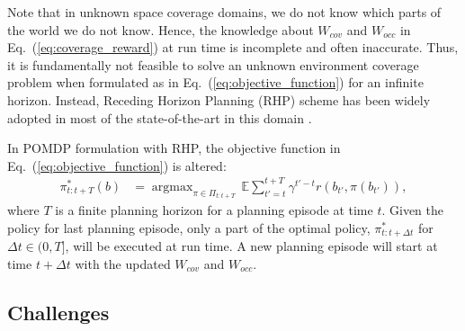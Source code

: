 \documentclass[letterpaper]{article} %
\newcommand{\phdone}[1]{} %
\newcommand{\argmax}{\mathop{\mathrm{argmax}}}
\begin{document}
\phdone{Receding Horizon Planning}
Note that in unknown space coverage domains, we do not know which parts of the world we do not know. Hence, the knowledge about $W_{cov}$ and $W_{occ}$ in Eq.~(\ref{eq:coverage_reward}) at run time is incomplete and often inaccurate.
%
Thus, it is fundamentally not feasible to solve an unknown environment coverage problem when formulated as in Eq.~(\ref{eq:objective_function}) for an infinite horizon.
Instead, Receding Horizon Planning (RHP) scheme has been widely adopted in most of the state-of-the-art in this domain \cite{bircher2016receding}.

\phdone{RHP Objective Function}
In POMDP formulation with RHP, the objective function in Eq.~(\ref{eq:objective_function}) is altered:
\begin{align}
  \pi_{t:t+T}^*(b) &= \argmax_{\pi \in \Pi_{t:t+T}} \, \mathbb{E} \sum_{t'=t}^{t+T} \gamma^{t'-t} r(b_{t'}, \pi(b_{t'})),
  \label{eq:receding_objective_function}
\end{align}
where $T$ is a finite planning horizon for a planning episode at time $t$.
Given the policy for last planning episode, only a part of the optimal policy, $\pi^*_{t:t+\Delta t}$ for $\Delta t \in (0, T]$, will be executed at run time. A new planning episode will start at time $t+\Delta t$ with the updated $W_{cov}$ and $W_{occ}$.



\subsection{Challenges} \label{ssec:challenges}

    
\end{document}
